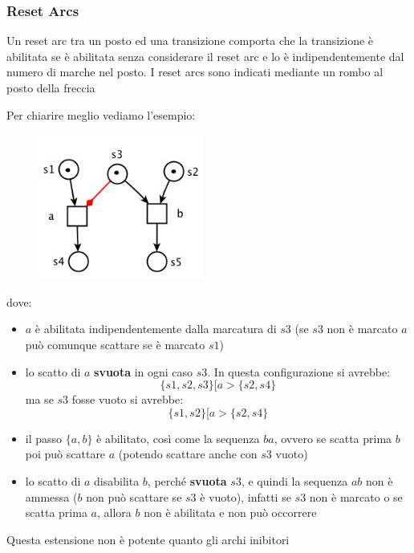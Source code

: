 \documentclass[a4paper,12pt, oneside]{book}
\begin{document}
\subsubsection{Reset Arcs}
\begin{definizione}
  Un reset arc tra un posto ed una transizione comporta che la transizione è
  abilitata se è abilitata senza considerare il reset arc e lo è
  indipendentemente dal numero di marche nel posto. I reset arcs sono indicati
  mediante un rombo al posto della freccia
\end{definizione}
Per chiarire meglio vediamo l'esempio:
\begin{figure}[H]
  \centering
  \includegraphics[scale = 0.7]{img/ra3.jpg}
\end{figure}
dove:
\begin{itemize}
  \item $a$ è abilitata indipendentemente dalla marcatura di $s3$ (se $s3$ non è
  marcato $a$ può comunque scattare se è marcato $s1$)
  \item lo scatto di $a$ \textbf{svuota} in ogni caso $s3$. In questa
  configurazione si avrebbe:
  \[\{s1 , s2 , s3 \}[a > \{s2 , s4 \}\]
  ma se $s3$ fosse vuoto si avrebbe:
  \[\{s1 , s2 \}[a > \{s2 , s4 \}\]
  \item il passo $\{a, b\}$ è abilitato, così come la sequenza $ba$, ovvero se
  scatta prima $b$ poi può scattare $a$ (potendo scattare anche con $s3$ vuoto)
  \item lo scatto di $a$ disabilita $b$, perché \textbf{svuota} $s3$, e quindi
  la sequenza $ab$ non è ammessa ($b$ non può scattare se $s3$ è vuoto), infatti
  se $s3$ non è marcato o se scatta prima $a$, allora $b$ non è abilitata e non
  può occorrere
\end{itemize}
Questa estensione non è potente quanto gli archi inibitori
\end{document}
